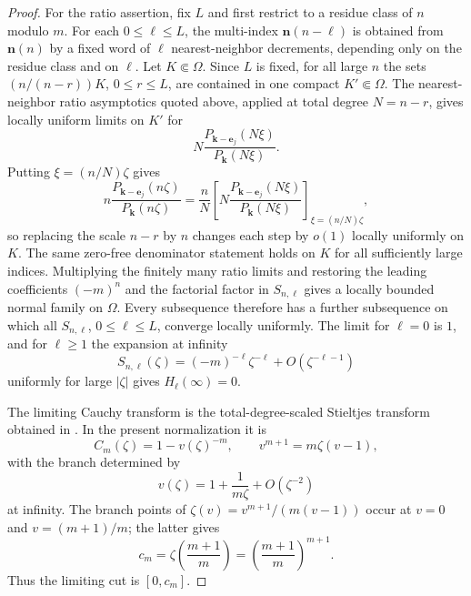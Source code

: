 \documentclass[reqno]{article}
\theoremstyle{definition}
\theoremstyle{remark}
\theoremstyle{plain}
\begin{document}
\begin{proof}
For the ratio assertion, fix $L$ and first restrict to a residue class of $n$ modulo $m$. For each $0\le\ell\le L$, the multi-index $\boldsymbol n(n-\ell)$ is obtained from $\boldsymbol n(n)$ by a fixed word of $\ell$ nearest-neighbor decrements, depending only on the residue class and on $\ell$. Let $K\Subset\Omega$. Since $L$ is fixed, for all large $n$ the sets $(n/(n-r))K$, $0\le r\le L$, are contained in one compact $K'\Subset\Omega$. The nearest-neighbor ratio asymptotics quoted above, applied at total degree $N=n-r$, gives locally uniform limits on $K'$ for
\[
N\frac{P_{\boldsymbol k-\mathbf e_j}(N\xi)}{P_{\boldsymbol k}(N\xi)}.
\]
Putting $\xi=(n/N)\zeta$ gives
\[
n\frac{P_{\boldsymbol k-\mathbf e_j}(n\zeta)}{P_{\boldsymbol k}(n\zeta)}
=\frac{n}{N}\left[
N\frac{P_{\boldsymbol k-\mathbf e_j}(N\xi)}{P_{\boldsymbol k}(N\xi)}
\right]_{\xi=(n/N)\zeta},
\]
so replacing the scale $n-r$ by $n$ changes each step by $o(1)$ locally uniformly on $K$. The same zero-free denominator statement holds on $K$ for all sufficiently large indices. Multiplying the finitely many ratio limits and restoring the leading coefficients $(-m)^n$ and the factorial factor in $S_{n,\ell}$ gives a locally bounded normal family on $\Omega$. Every subsequence therefore has a further subsequence on which all $S_{n,\ell}$, $0\le\ell\le L$, converge locally uniformly. The limit for $\ell=0$ is $1$, and for $\ell\ge1$ the expansion at infinity
\[
S_{n,\ell}(\zeta)=(-m)^{-\ell}\zeta^{-\ell}+O(\zeta^{-\ell-1})
\]
uniformly for large $|\zeta|$ gives $H_\ell(\infty)=0$.

The limiting Cauchy transform is the total-degree-scaled Stieltjes transform obtained in \cite[\S6]{NVA}. In the present normalization it is
$$C_m(\zeta)=1-v(\zeta)^{-m},\qquad v^{m+1}=m\zeta(v-1),$$
with the branch determined by
$$v(\zeta)=1+\frac1{m\zeta}+O(\zeta^{-2})$$
at infinity. The branch points of $\zeta(v)=v^{m+1}/(m(v-1))$ occur at $v=0$ and $v=(m+1)/m$; the latter gives
$$c_m=\zeta\!\left(\frac{m+1}{m}\right)=\left(\frac{m+1}{m}\right)^{m+1}.$$
Thus the limiting cut is $[0,c_m]$.
\end{proof}
\end{document}
